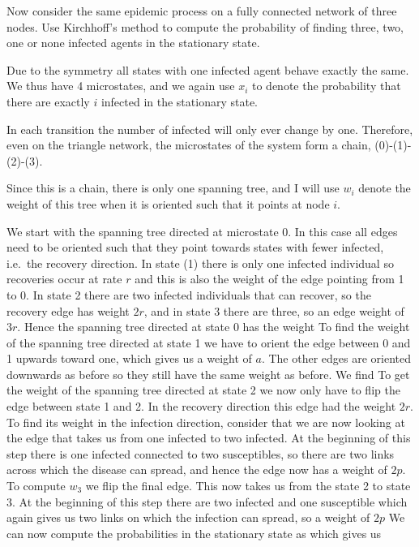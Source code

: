 \subquestion 
Now consider the same epidemic process on a fully connected network of three nodes. Use Kirchhoff's method to compute the probability of finding three, two, one or none infected agents in the stationary state. 

\solution
Due to the symmetry all states with one infected agent behave exactly the same. We thus have 4 microstates, and we again use $x_i$ to denote the probability that there are exactly $i$ infected in the stationary state.

In each transition the number of infected will only ever change by one. Therefore, even on the triangle network, the microstates of the system form a chain, (0)-(1)-(2)-(3).

Since this is a chain, there is only one spanning tree, and I will use $w_i$ denote the weight of this tree when it is oriented such that it points at node $i$. 

We start with the spanning tree directed at microstate 0. In this case all edges need to be oriented such that they point towards states with fewer infected, i.e.~the recovery direction. In state (1) there is only one infected individual so recoveries occur at rate $r$ and this is also the weight of the edge pointing from 1 to 0. In state 2 there are two infected individuals that can recover, so the recovery edge has weight $2r$, and in state 3 there are three, so an edge weight of $3r$. Hence the spanning tree directed at state 0 has the weight
To find the weight of the spanning tree directed at state 1 we have to orient the edge between 0 and 1 upwards toward one, which gives us a weight of $a$. The other edges are oriented downwards as before so they still have the same weight as before. We find 
To get the weight of the spanning tree directed at state 2 we now only have to flip the edge between state 1 and 2. In the recovery direction this edge had the weight $2r$. To find its weight in the infection direction, consider that we are now looking at the edge that takes us from one infected to two infected. At the beginning of this step there is one infected connected to two susceptibles, so there are two links across which the disease can spread, and hence the edge now has a weight of $2p$.
To compute $w_3$ we flip the final edge. This now takes us from the state 2 to state 3. At the beginning of this step there are two infected and one susceptible which again gives us two links on which the infection can spread, so a weight of $2p$
We can now compute the probabilities in the stationary state as
which gives us 

